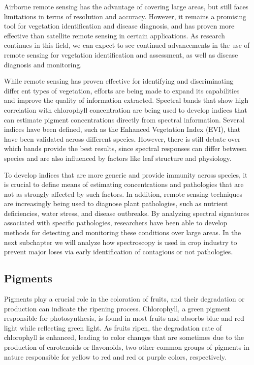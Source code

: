 \documentclass{article}
\begin{document}
{                Airborne remote sensing has the advantage of covering large areas, but still faces limitations in terms of resolution and accuracy. However, it remains a promising tool for vegetation identification and disease diagnosis, and has proven more effective than satellite remote sensing in certain applications. As research continues in this field, we can expect to see continued advancements in the use of remote sensing for vegetation identification and assessment, as well as disease diagnosis and monitoring.\par
                While remote sensing has proven effective for identifying and discriminating different types of vegetation, efforts are being made to expand its capabilities and improve the quality of information extracted. Spectral bands that show high correlation with chlorophyll concentration are being used to develop indices that can estimate pigment concentrations directly from spectral information. Several indices have been defined, such as the Enhanced Vegetation Index (EVI), that have been validated across different species. However, there is still debate over which bands provide the best results, since spectral responses can differ between species and are also influenced by factors like leaf structure and physiology.\par
                To develop indices that are more generic and provide immunity across species, it is crucial to define means of estimating concentrations and pathologies that are not as strongly affected by such factors. In addition, remote sensing techniques are increasingly being used to diagnose plant pathologies, such as nutrient deficiencies, water stress, and disease outbreaks. By analyzing spectral signatures associated with specific pathologies, researchers have been able to develop methods for detecting and monitoring these conditions over large areas. In the next subchapter we will analyze how spectroscopy is used in crop industry to prevent major loses via early identification of contagious or not pathologies.
                \newpage
            \subsection{Pigments}
            \hspace{0.5cm}Pigments play a crucial role in the coloration of fruits, and their degradation or production can indicate the ripening process. Chlorophyll, a green pigment responsible for photosynthesis, is found in most fruits and absorbs blue and red light while reflecting green light. As fruits ripen, the degradation rate of chlorophyll is enhanced, leading to color changes that are sometimes due to the production of carotenoids or flavonoids, two other common groups of pigments in nature responsible for yellow to red and red or purple colors, respectively.\par
            \vspace*{1\baselineskip}
            
}
\end{document}
